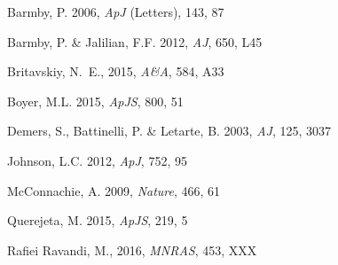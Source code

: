 \documentclass{iau}
\begin{document}
\begin{thebibliography}{}

{{Barmby,} P. \etal} 2006, \textit{ApJ} (Letters), 143, 87

{{Barmby,} P. \& {Jalilian}, F.F.} 2012, \textit{AJ}, 650, L45

{{Britavskiy}, N.~E., \etal}
2015, \textit{A\&A}, 584, A33

{{Boyer}, M.L. \etal} 2015, \textit{ApJS}, 800, 51

{{Demers}, S., {Battinelli}, P. \& {Letarte}, B.} 2003, \textit{AJ}, 125, 3037

{Johnson, L.C. \etal} 2012, \textit{ApJ}, 752, 95

{{McConnachie}, A. \etal} 2009, \textit{Nature}, 466, 61

{{Querejeta}, M. \etal} 2015, \textit{ApJS}, 219, 5

{{Rafiei Ravandi}, M., \etal}  2016, \textit{MNRAS}, 453, XXX


\end{thebibliography}
\end{document}
